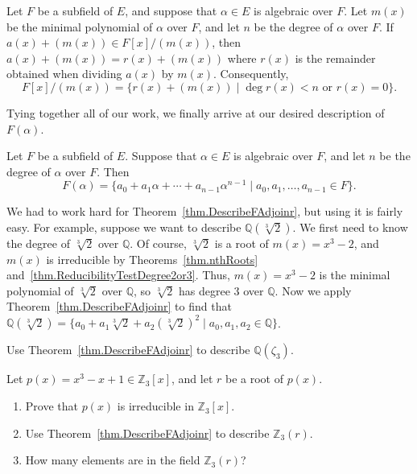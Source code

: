 \begin{lemma}\label{lem.DescribeQuotientWithRemainders}
Let $F$ be a subfield of $E$, and suppose that $\alpha\in E$ is algebraic over $F$. Let $m(x)$ be the minimal polynomial of $\alpha$ over $F$, and let $n$ be the degree of $\alpha$ over $F$.  If $a(x) + (m(x)) \in F[x]/(m(x))$, then $a(x) + (m(x)) =  r(x) + (m(x))$ where $r(x)$ is the remainder obtained when dividing $a(x)$ by $m(x)$. Consequently,
\[F[x]/(m(x)) = \{r(x) +  (m(x)) \mid \deg r(x) < n \text{ or } r(x) = 0\}.\]
\end{lemma}

Tying together all of our work, we finally arrive at our desired description of $F(\alpha)$.

\begin{theorem}\label{thm.DescribeFAdjoinr}
Let $F$ be a subfield of $E$. Suppose that $\alpha\in E$ is algebraic over $F$, and let $n$ be the degree of $\alpha$ over $F$. Then \[F(\alpha) = \{a_0 + a_1\alpha+\cdots+a_{n-1}\alpha^{n-1} \mid a_0,a_1,\ldots,a_{n-1} \in F\}.\]
\end{theorem}

We had to work hard for Theorem~\ref{thm.DescribeFAdjoinr}, but using it is fairly easy. For example, suppose we want to describe $\mathbb{Q}(\sqrt[3]{2})$. We first need to know the degree of $\sqrt[3]{2}$ over $\mathbb{Q}$. Of course, $\sqrt[3]{2}$ is a root of $m(x) = x^3-2$, and $m(x)$ is irreducible by Theorems~\ref{thm.nthRoots} and~\ref{thm.ReducibilityTestDegree2or3}. Thus, $m(x) = x^3-2$ is the minimal polynomial of $\sqrt[3]{2}$ over $\mathbb{Q}$, so $\sqrt[3]{2}$ has degree $3$ over $\mathbb{Q}$. Now we  apply Theorem~\ref{thm.DescribeFAdjoinr} to find that $\mathbb{Q}(\sqrt[3]{2}) = \{a_0 + a_1\sqrt[3]{2}+a_{2}(\sqrt[3]{2})^{2} \mid a_0,a_1,a_2 \in \mathbb{Q}\}$.

\begin{problem}
Use  Theorem~\ref{thm.DescribeFAdjoinr} to describe $\mathbb{Q}(\zeta_3)$.
\end{problem}

\begin{problem} Let $p(x) = x^3-x+1 \in \mathbb{Z}_3[x]$, and let $r$ be a root of $p(x)$. 
\begin{enumerate}
\item Prove that $p(x)$ is irreducible in $\mathbb{Z}_3[x]$. 
\item Use Theorem~\ref{thm.DescribeFAdjoinr} to describe $\mathbb{Z}_3(r)$.
\item How many elements are in the field $\mathbb{Z}_3(r)$?
\end{enumerate}
\end{problem}

